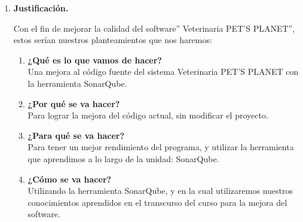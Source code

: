 \documentclass[12pt,a4paper,oneside]{book}
\begin{document}
\begin{enumerate}
\begin{enumerate}
					El problema de todo estudiante del cual empieza con el desarrollo de software de una manera principiante, es el no uso de m\'etricas que pueden ayudar a la calidad del c\'odigo al cual nosotros queremos implementar, es por eso que el programa actual del cual ya está desarrollado no cuenta con un uso correcto de m\'etricas, por lo tanto, este c\'odigo siempre puede optar por mejorar. \\
					
					La actualizaci\'on de este c\'odigo no debe afectar al funcionamiento del programa, pero s\'i a su rendimiento. Dicho esto, el código fuente actual puede ser mejorable.\\
					
					
					\item \textbf{Justificaci\'on.}
					
					Con el fin de mejorar la calidad del software” Veterinaria PET’S PLANET”, estos serían nuestros planteamientos que nos haremos:
					
					\begin{enumerate}
						
						\item \textbf{¿Qu\'e es lo que vamos de hacer?} \\
						
						 Una mejora al c\'odigo fuente del sistema Veterinaria PET’S PLANET con la herramienta SonarQube.\\
						
						\item \textbf{¿Por qu\'e se va hacer?} \\
						
						Para lograr la mejora del c\'odigo actual, sin modificar el proyecto.\\
						
						\item \textbf{¿Para qu\'e se va hacer?} \\
						 
						Para tener un mejor rendimiento del programa, y utilizar la herramienta que aprendimos a lo largo de la unidad: SonarQube.\\
						
						\item \textbf{¿C\'omo se va hacer?} \\ 
						
						Utilizando la herramienta SonarQube, y en la cual utilizaremos nuestros conocimientos aprendidos en el transcurso del curso para la mejora del software.\\
						

\end{enumerate}
\end{enumerate}
\end{enumerate}
\end{document}

